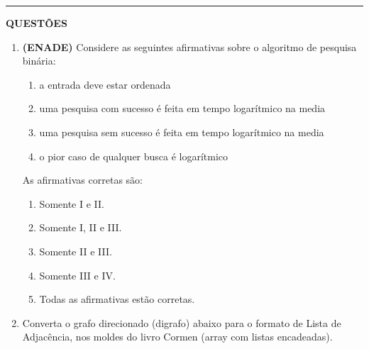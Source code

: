 \documentclass[12pt,a4paper]{article}
\begin{document}
\begin{center}
    \rule{\textwidth}{0.4pt}
    \textbf{QUESTÕES}
\end{center}

\vspace{0.5cm} 
\begin{enumerate}
    \item \textbf{(ENADE)} Considere as seguintes afirmativas sobre o algoritmo de pesquisa binária:
\begin{enumerate}[label=\Roman*.]
    \item a entrada deve estar ordenada
    \item uma pesquisa com sucesso é feita em tempo logarítmico na media
    \item uma pesquisa sem sucesso é feita em tempo logarítmico na media
    \item o pior caso de qualquer busca é logarítmico
\end{enumerate}

As afirmativas corretas são:
\begin{enumerate}[label=(\Alph*)]
    \item Somente I e II.
    \item Somente I, II e III.
    \item Somente II e III.
    \item Somente III e IV.
    \item Todas as afirmativas estão corretas.
\end{enumerate}
     
    
    \item Converta o grafo direcionado (digrafo) abaixo para o formato de Lista de Adjacência, nos moldes do livro Cormen (array com listas encadeadas).

\begin{center}
\end{center}


\end{enumerate}
\end{document}
